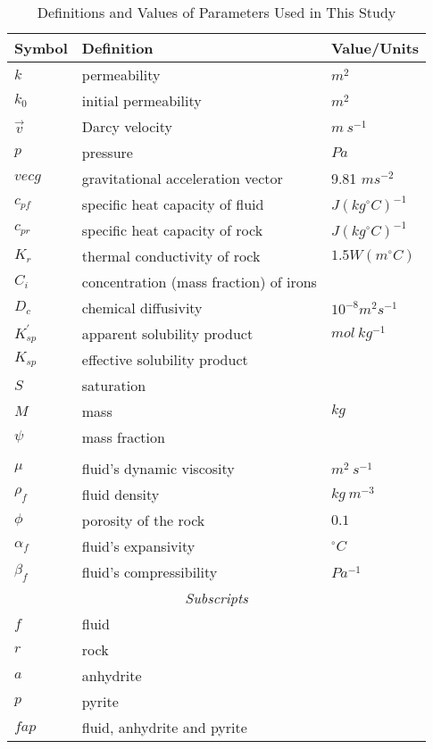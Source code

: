 \begin{table}[!b]
    \caption[数学符号列表]{Definitions and Values of Parameters Used in This Study}
    \centering
    \begin{tabular}{lll}
    \hline
    Symbol & Definition          & Value/Units \\ \hline
    $k$    & permeability         & $m^2$       \\ 
    $k_0$  & initial permeability & $m^2$       \\ 
    $\vec{v}$                    & Darcy velocity                            & $m\ s^{-1}$                        \\
    $p$                          & pressure                                  & $Pa$                             \\
    $vec{g}$                     & gravitational acceleration vector         & 9.81 $ms^{-2}$                  \\
    $c_{pf}$  & specific heat capacity of fluid & $J(kg^{\circ}C)^{-1}$ \\
    $c_{pr}$  & specific heat capacity of rock  & $J(kg^{\circ}C)^{-1}$ \\
    $K_r$  & thermal conductivity of rock  & $1.5 W(m^{\circ}C)$ \\
    $C_i$  & concentration (mass fraction) of irons  & \\
    $D_c$  & chemical diffusivity  & $10^{-8} m^2s^{-1}$ \\
    $K_{sp}^{\prime}$  & apparent solubility product  & $mol\ kg^{-1}$ \\
    $K_{sp}$  & effective solubility product  &  \\
    $S$ & saturation & \\
    $M$  & mass  & $kg$  \\
    $\psi$  & mass fraction & \\
    \multicolumn{3}{c}{\centering{\textit{Greek Symbols}}}  \\
    $\mu$ & fluid's dynamic viscosity & $m^2\ s^{-1}$ \\
    $\rho_f$  & fluid density & $kg\ m^{-3}$ \\
    $\phi$ & porosity of the rock & $0.1$ \\
    $\alpha_f$  & fluid's expansivity & $^{\circ}C$ \\
    $\beta_f$ & fluid's compressibility & $Pa^{-1}$ \\
    \multicolumn{3}{c}{\textit{Subscripts}} \\
    $f$ & fluid & \\
    $r$ & rock & \\
    $a$ & anhydrite & \\
    $p$ & pyrite & \\
    $fap$ & fluid, anhydrite and pyrite & \\
    \hline
    \end{tabular}
    \label{tab:symbols}
\end{table}